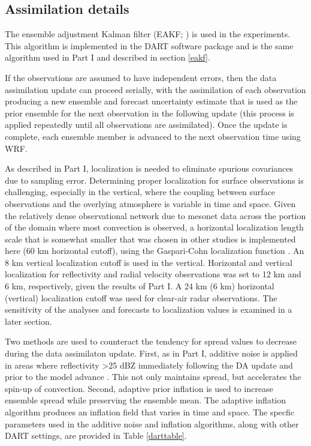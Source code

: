 \subsection{Assimilation details}
The ensemble adjustment Kalman filter (EAKF; \citealt{anderson01,anderson03}) is used in the experiments. This algorithm is implemented in the DART software package and is the same algorithm used in Part I and described in section \ref{eakf}.

If the observations are assumed to have independent errors, then the data assimilation update can proceed serially, with the assimilation of each observation producing a new ensemble and forecast uncertainty estimate that is used as the prior ensemble for the next observation in the following update (this process is applied repeatedly until all observations are assimilated). Once the update is complete, each ensemble member is advanced to the next observation time using WRF.

As described in Part I, localization is needed to eliminate spurious covariances due to sampling error. Determining proper localization for surface observations is challenging, especially in the vertical, where the coupling between surface observations and the overlying atmosphere is variable in time and space. Given the relatively dense observational network due to mesonet data across the portion of the domain where most convection is observed, a horizontal localization length scale that is somewhat smaller that was chosen in other studies is implemented here (60 km horizontal cutoff), using the Gaspari-Cohn localization function \citet{gasparicohn99}. An 8 km vertical localization cutoff is used in the vertical. Horizontal and vertical localization for reflectivity and radial velocity observations was set to 12 km and 6 km, respectively, given the results of Part I. A 24 km (6 km) horizontal (vertical) localization cutoff was used for clear-air radar observations. The sensitivity of the analyses and forecasts to localization values is examined in a later section.

Two methods are used to counteract the tendency for spread values to decrease during the data assimilaton update. First, as in Part I, additive noise is applied in areas where reflectivity \textgreater 25 dBZ immediately following the DA update and prior to the model advance \citep{dowellwicker09}. This not only maintains spread, but accelerates the spin-up of convection. Second, adaptive prior inflation \citep{anderson09} is used to increase ensemble spread while preserving the ensemble mean. The adaptive inflation algorithm produces an inflation field that varies in time and space. The specfic parameters used in the additive noise and inflation algorithms, along with other DART settings, are provided in Table \ref{darttable}.

